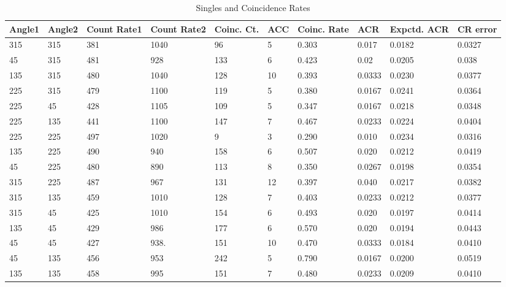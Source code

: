\documentclass{article}
\begin{document}
\begin{table}[]
\centering
\caption{Singles and Coincidence Rates}
\label{table}
\begin{tabular}{@{}llllllllll@{}}
\toprule
Angle1 & Angle2 & Count Rate1 & Count Rate2 & Coinc. Ct. & ACC & Coinc. Rate & ACR         & Expctd. ACR & CR error    \\ \midrule
315    & 315    & 381  & 1040  & 96         & 5             & 0.303 & 0.017 & 0.0182     & 0.0327 \\
45     & 315    & 481  & 928  & 133        & 6             & 0.423 & 0.02        & 0.0205     & 0.038 \\
135    & 315    & 480  & 1040  & 128        & 10            & 0.393 & 0.0333 & 0.0230     & 0.0377 \\
225    & 315    & 479  & 1100  & 119        & 5             & 0.380        & 0.0167 & 0.0241     & 0.0364 \\
225    & 45     & 428      & 1105  & 109        & 5             & 0.347 & 0.0167 & 0.0218     & 0.0348 \\
225    & 135    & 441  & 1100  & 147        & 7             & 0.467 & 0.0233 & 0.0224     & 0.0404 \\
225    & 225    & 497  & 1020  & 9         & 3             & 0.290        & 0.010        & 0.0234     & 0.0316 \\
135    & 225    & 490  & 940       & 158        & 6             & 0.507 & 0.020        & 0.0212     & 0.0419  \\
45     & 225    & 480  & 890 & 113        & 8             & 0.350        & 0.0267 & 0.0198     & 0.0354 \\
315    & 225    & 487  & 967  & 131        & 12            & 0.397 & 0.040        & 0.0217     & 0.0382 \\
315    & 135    & 459  & 1010      & 128        & 7             & 0.403 & 0.0233 & 0.0212     & 0.0377 \\
315    & 45     & 425          & 1010  & 154        & 6             & 0.493 & 0.020        & 0.0197     & 0.0414 \\
135    & 45     & 429  & 986  & 177        & 6             & 0.570        & 0.020        & 0.0194     & 0.0443 \\
45     & 45     & 427       & 938.  & 151        & 10            & 0.470        & 0.0333 & 0.0184     & 0.0410 \\
45     & 135    & 456  & 953  & 242        & 5             & 0.790        & 0.0167 & 0.0200     & 0.0519 \\
135    & 135    & 458       & 995  & 151        & 7             & 0.480        & 0.0233 & 0.0209     & 0.0410 \\ \bottomrule
\end{tabular}
\end{table}
\end{document}
